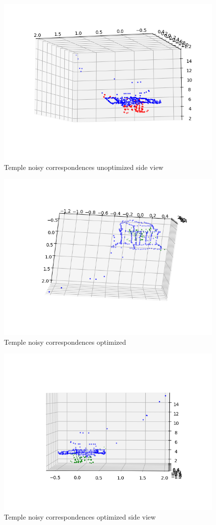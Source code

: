 \documentclass[12pt]{article}
\begin{document}
\begin{figure}[H]
\centering
\includegraphics[page=1,width=1\textwidth]{q5_3b}
\caption{Temple noisy correspondences unoptimized side view } 
\label{fig:unoptside}
\end{figure}   

\begin{figure}[H]
\centering
\includegraphics[page=1,width=1\textwidth]{q5_3c}
\caption{Temple noisy correspondences optimized } 
\label{fig:opt}
\end{figure}   

\begin{figure}[H]
\centering
\includegraphics[page=1,width=1\textwidth]{q5_3d}
\caption{Temple noisy correspondences optimized side view} 
\label{fig:optside}
\end{figure}   
\end{document}

